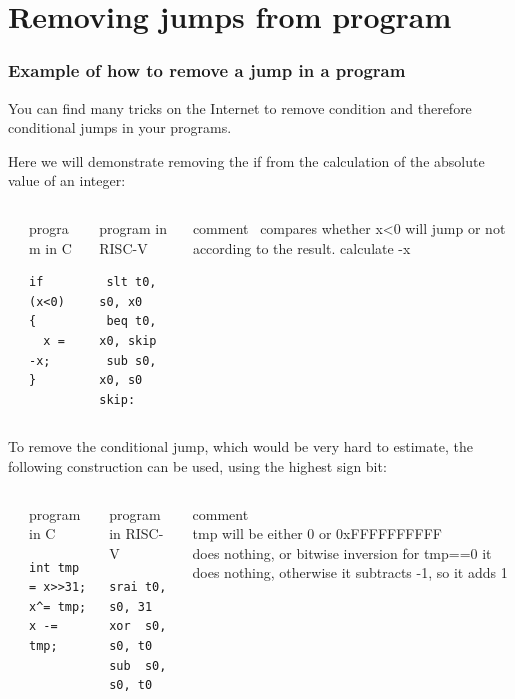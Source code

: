 \documentclass{beamer}
\begin{document}
\section{Removing jumps from program}

\begin{frame}[fragile]
\frametitle{Example of how to remove a jump in a program}

You can find many tricks on the Internet to remove condition and therefore conditional jumps in your programs.

Here we will demonstrate removing the if from the calculation of the absolute value of an integer:

\begin{columns}[T]
\begin{column}{0.01\textwidth}
\phantom{x}
\end{column}
\begin{column}{0.25\textwidth}
program in C
\begin{verbatim}
if (x<0) {
  x = -x;
}
\end{verbatim}
\end{column}

\begin{column}{0.28\textwidth}
program in RISC-V
\begin{verbatim}
 slt t0, s0, x0
 beq t0, x0, skip
 sub s0, x0, s0
skip:
\end{verbatim}
\end{column}
\begin{column}{0.45\textwidth}
\phantom{x}comment\
\small
compares whether x<0
will jump or not according to the result.
calculate -x
\end{column}
\end{columns}
\bigskip

To remove the conditional jump, which would be very hard to estimate, the following construction can be used, using the highest sign bit:
\begin{columns}[T]
\begin{column}{0.01\textwidth}
\phantom{x}
\end{column}
\begin{column}{0.25\textwidth}
program in C
\begin{verbatim}
int tmp = x>>31;
x^= tmp;
x -= tmp;
\end{verbatim}
\end{column}

\begin{column}{0.28\textwidth}
program in RISC-V
\begin{verbatim}
srai t0, s0, 31
xor  s0, s0, t0
sub  s0, s0, t0
\end{verbatim}
\end{column}
\begin{column}{0.45\textwidth}
\phantom{x}comment\\
\small
tmp will be either 0 or 0xFFFFFFFFFF\\
does nothing, or bitwise inversion
for tmp==0 it does nothing, otherwise it subtracts -1, so it adds 1
\end{column}
\end{columns}
\end{frame}
\end{document}
